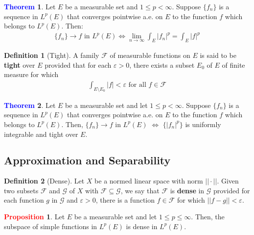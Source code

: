 \documentclass[11pt]{article}
\theoremstyle{definition}
\theoremstyle{definition}
\newtheorem{theorem}{\textcolor{blue}{Theorem}}
\theoremstyle{definition}
\newtheorem{definition}{\textcolor{OliveGreen}{Definition}}
\newtheorem{prop}{\textcolor{red}{Proposition}}
\theoremstyle{remark}
\begin{document}
\begin{theorem}
	Let $E$ be a measurable set and $1 \leq p < \infty$. Suppose $\{ f_n \}$ is a sequence in $L^p(E)$ that converges pointwise a.e. on $E$ to the function $f$ which belongs to $L^p(E)$. Then: 
	\begin{align*} 
		\{ f_n \} \rightarrow f \text{ in } L^p(E) \iff \lim_{n \rightarrow \infty } \int_E |f_n | ^p = \int_E |f|^p 	
	\end{align*}
\end{theorem}

\begin{definition}[Tight]
	A family $\mathcal{F}$ of measurable functions on $E$ is said to be \textbf{tight} over $E$ provided that for each $\varepsilon > 0$, there exists a subset $E_0$ of $E$ of finite measure for which 
	\begin{align*}
		\int_{E \setminus E_0 } |f| < \varepsilon \text{ for all } f \in \mathcal{F}	
	\end{align*}

\end{definition}
\begin{theorem}
	Let $E$ be a measurable set and let $1 \leq p < \infty$. Suppose $\{ f_n \}$ is a sequence in $L^p(E)$ that converges pointwise a.e. on $E$ to the function $f$ which belongs to $L^p(E)$. Then, $\{ f_n \} \rightarrow f$ in $L^p(E)$ $\iff$ $\{ |f_n|^p \}$ is uniformly integrable and tight over $E$. 
\end{theorem}

\subsection{Approximation and Separability}

\begin{definition}[Dense]
	Let $X$ be a normed linear space with norm $|| \cdot ||$. Given two subsets $\mathcal{F}$ and $\mathcal{G}$ of $X$ with $\mathcal{F} \subseteq \mathcal{G}$, we say that $\mathcal{F}$ is \textbf{dense} in $\mathcal{G}$ provided for each function $g$ in $\mathcal{G}$ and $\varepsilon > 0$, there is a function $f \in \mathcal{F}$ for which $||f - g || < \varepsilon$. 
\end{definition}

\begin{prop}
	Let $E$ be a measurable set and let $1 \leq p \leq \infty$. Then, the subspace of simple functions in $L^p(E)$ is dense in $L^p(E)$. 
\end{prop}
\end{document}
